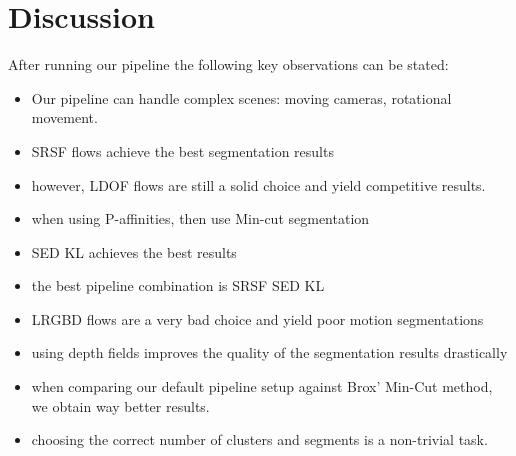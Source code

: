 \section{Discussion}
After running our pipeline the following key observations can be stated:
\begin{itemize}
  \item Our pipeline can handle complex scenes: moving cameras, rotational movement.
  \item SRSF flows achieve the best segmentation results
  \item however, LDOF flows are still a solid choice and yield competitive results.
  \item when using P-affinities, then use Min-cut segmentation
  \item SED KL achieves the best results
  \item the best pipeline combination is SRSF SED KL 
  \item LRGBD flows are a very bad choice and yield poor motion segmentations
  \item using depth fields improves the quality of the segmentation results drastically
  \item when comparing our default pipeline setup against Brox' Min-Cut method, we obtain way better results.
  \item choosing the correct number of clusters and segments is a non-trivial task.
\end{itemize}











